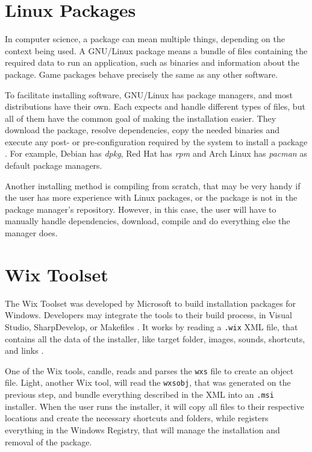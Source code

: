 \section{Linux Packages}
\label {sec:packages}

In computer science, a package can mean multiple things, depending on the context being used. A GNU/Linux package means a bundle of files containing the required data to run an application, such as binaries and information about the package. Game packages behave precisely the same as any other software.

To facilitate installing software, GNU/Linux has package managers, and most distributions have their own. Each expects and handle different types of files, but all of them have the common goal of making the installation easier. They download the package, resolve dependencies, copy the needed binaries and execute any post- or pre-configuration required by the system to install a package \cite{linode2017linux}. For example, Debian has \textit{dpkg}, Red Hat has \textit{rpm} and Arch Linux has \textit{pacman} as default package managers.

Another installing method is compiling from scratch, that may be very handy if the user has more experience with Linux packages, or the package is not in the package manager's repository. However, in this case, the user will have to manually handle dependencies, download, compile and do everything else the manager does.


\section{Wix Toolset}
\label{sec:wix_toolset}

The Wix Toolset was developed by Microsoft to build installation packages for Windows. Developers may integrate the tools to their build process, in Visual Studio, SharpDevelop, or Makefiles \cite{firegiant2017tutorial}. It works by reading a \texttt{.wix} XML file, that contains all the data of the installer, like target folder, images, sounds, shortcuts, and links \cite{wix2017wikipedia}.

One of the Wix tools, candle, reads and parses the \texttt{wxs} file to create an object file. Light, another Wix tool, will read the \texttt{wxsobj}, that was generated on the previous step, and bundle everything described in the XML into an \texttt{.msi} installer. When the user runs the installer, it will copy all files to their respective locations and create the necessary shortcuts and folders, while registers everything in the Windows Registry, that will manage the installation and removal of the package.


